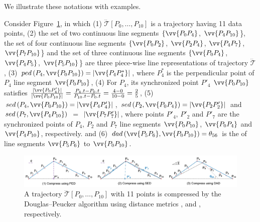 We illustrate these notations with examples.

\begin{example}
	\label{exm-notations}
	Consider {Figure}~\ref{fig:dp}, in which
	(1) $\dddot{\mathcal{T}}\left[P_0, \ldots, P_{10}\right]$ is a trajectory having 11 data points,
    (2) the set of two continuous line segments $\{\vv{P_0P_4}$, $\vv{P_4P_{10}}$\}, the set of four continuous line segments $\{\vv{P_0P_2}$, $\vv{P_2P_4}$, $\vv{P_4P_7}$, $\vv{P_7P_{10}}$\} and the set of three continuous line segments $\{\vv{P_0P_4}$, $\vv{P_4P_5}$, $\vv{P_5P_{10}}$\} are three piece-wise line representations of trajectory $\dddot{\mathcal{T}}$,
	(3) $ped\left(P_4, \vv{P_0P_{10}}\right)=|\vv{P_4P^*_4}|$, where $P^*_4$ is the perpendicular point of $P_4$ \wrt line segment $\vv{P_0P_{10}}$,
	(4) For $P_4$, its synchronized point $P'_4$ \wrt $\vv{P_0P_{10}}$ satisfies $\frac{|\vv{P_0P'_4}|}{|\vv{P_0P_{10}}|} = \frac{P_4.t - P_0.t}{P_{10}.t-P_0.t} = \frac{4-0}{10-0}= \frac{2}{5}$,
	(5) $sed\left(P_4, \vv{P_0P_{10}}\right)= |\vv{P_4P'_4}|$, $sed\left(P_2, \vv{P_0P_{4}}\right)= |\vv{P_2P'_2}|$ and $sed\left(P_7, \vv{P_4P_{10}}\right)$ $=$ $|\vv{P_7P'_7}|$,
	where points $P'_4$, $P'_2$ and $P'_7$ are the synchronized points of $P_4$, $P_2$ and $P_7$ \wrt line segments $\vv{P_0P_{10}}$, $\vv{P_0P_{4}}$ and $\vv{P_4P_{10}}$, respectively.  and
    (6) $dad\left(\vv{P_5P_6}, \vv{P_0P_{10}}\right)=\theta_{56}$ is the \dad of line segments $\vv{P_5P_6}$ to $\vv{P_0P_{10}}$.
\end{example}


\begin{figure}[tb!]
	\centering
	\includegraphics[scale=0.46]{Figures/Fig-DP.jpg}\vspace{-1ex}
	\caption{\small  A trajectory $\dddot{\mathcal{T}}[P_0, \ldots, P_{10}]$ with 11 points is compressed by the Douglas--Peucker algorithm \cite{Douglas:Peucker} using distance metrics \ped, \sed and \dad, respectively.}
		\vspace{-2ex}
	\label{fig:dp}
\end{figure}




